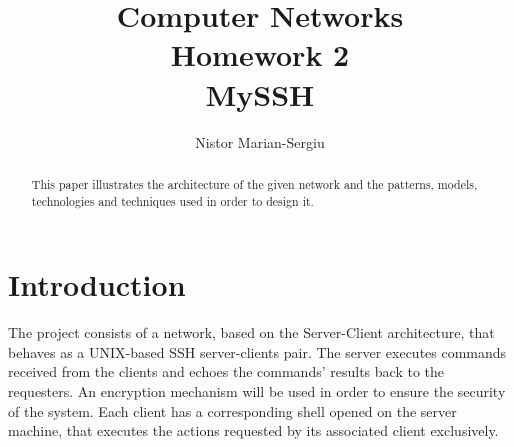 \documentclass[runningheads]{llncs}
\begin{document}
\title{Computer Networks\\ Homework 2\\ MySSH}
\author{Nistor Marian-Sergiu}

\maketitle

\begin{abstract}
This paper illustrates the architecture of the given network and the patterns, models, technologies and techniques used in order to design it.

\end{abstract}

\section{Introduction}
The project consists of a network, based on the Server-Client architecture, that behaves as a UNIX-based SSH server-clients pair. The server executes commands received from the clients and echoes the commands' results back to the requesters. An encryption mechanism will be used in order to ensure the security of the system. Each client has a corresponding shell opened on the server machine, that executes the actions requested by its associated client exclusively.
\end{document}
